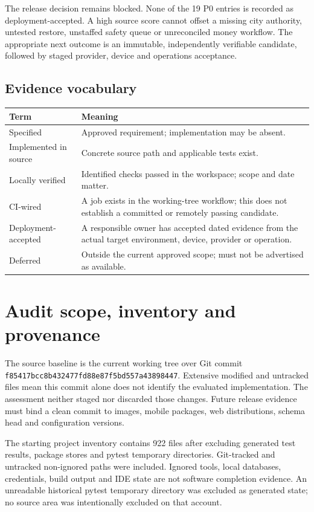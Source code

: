 \documentclass[11pt,a4paper]{article}
\newcommand{\src}[1]{{\small\nolinkurl{#1}}}
\begin{document}
The release decision remains blocked. None of the 19 P0 entries is recorded as
deployment-accepted. A high source score cannot offset a missing city authority,
untested restore, unstaffed safety queue or unreconciled money workflow. The
appropriate next outcome is an immutable, independently verifiable candidate,
followed by staged provider, device and operations acceptance.

\subsection{Evidence vocabulary}
\begin{tabularx}{\textwidth}{@{}p{}X@{}}
\toprule Term & Meaning \\\midrule
Specified & Approved requirement; implementation may be absent. \\
Implemented in source & Concrete source path and applicable tests exist. \\
Locally verified & Identified checks passed in the workspace; scope and date matter. \\
CI-wired & A job exists in the working-tree workflow; this does not establish a committed or remotely passing candidate. \\
Deployment-accepted & A responsible owner has accepted dated evidence from the actual target environment, device, provider or operation. \\
Deferred & Outside the current approved scope; must not be advertised as available. \\
\bottomrule
\end{tabularx}

\section{Audit scope, inventory and provenance}
The source baseline is the current working tree over Git commit
\src{f85417bcc8b432477fd88e87f5bd557a43898447}. Extensive modified and untracked
files mean this commit alone does not identify the evaluated implementation.
The assessment neither staged nor discarded those changes. Future release
evidence must bind a clean commit to images, mobile packages, web distributions,
schema head and configuration versions.

The starting project inventory contains 922 files after excluding generated
test results, package stores and pytest temporary directories. Git-tracked and
untracked non-ignored paths were included. Ignored tools, local databases,
credentials, build output and IDE state are not software completion evidence.
An unreadable historical pytest temporary directory was excluded as generated
state; no source area was intentionally excluded on that account.
\end{document}
